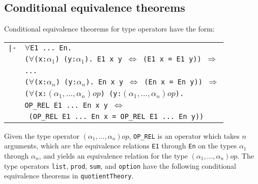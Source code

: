\documentclass[envcountsame,runningheads]{llncs}
\begin{document}
%
\subsection{Conditional equivalence theorems}
%
\label{condequivs}

Conditional equivalence theorems for type operators
have the form:
\begin{center}
\begin{tabular}{rl}
{\tt |-}& {\tt $\forall$E1 ... En. }  \\
& {\tt ($\forall$(x:$\alpha_1$) (y:$\alpha_1$). E1 x y $\Leftrightarrow$ (E1 x = E1 y)) $\Rightarrow$}  \\
& {\tt ...} \\
& {\tt ($\forall$(x:$\alpha_n$) (y:$\alpha_n$). En x y $\Leftrightarrow$ (En x = En y)) $\Rightarrow$}  \\
& {\tt ($\forall$(x:$(\alpha_1,...,\alpha_n)op$) (y:$(\alpha_1,...,\alpha_n)op$).}  \\
& \hspace{4mm}
{\tt OP\_REL E1 ... En x y $\Leftrightarrow$ }  \\
& {\tt
\hspace{5mm}
(OP\_REL E1 ... En x = OP\_REL E1 ... En y))}  \\
\end{tabular}
\end{center}

Given the type operator $(\alpha_1,...,\alpha_n)op$,
{\tt OP\_REL}
is
an operator which takes $n$ arguments,
which are the equivalence relations {\tt E1} through {\tt En}
on the types $\alpha_1$ through $\alpha_n$,
and yields an equivalence relation for the type $(\alpha_1,...,\alpha_n)op$.
The type operators {\tt list},
{\tt prod},
{\tt sum}, and
{\tt option}
have the following conditional equivalence theorems in {\tt quotientTheory}.
\end{document}
